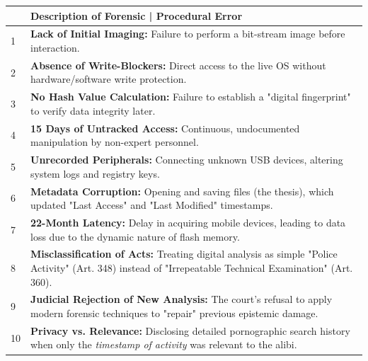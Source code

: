 \begin{table}[H]
\centering
\begin{tabular}{|l|p{13cm}|}
\hline
 & \textbf{Description of Forensic |   Procedural Error} \\
\hline
1 & \textbf{Lack of Initial Imaging:} Failure to perform a bit-stream image before interaction. \\
\hline
2 & \textbf{Absence of Write-Blockers:} Direct access to the live OS without hardware/software write protection. \\
\hline
3 & \textbf{No Hash Value Calculation:} Failure to establish a "digital fingerprint" to verify data integrity later. \\
\hline
4 & \textbf{15 Days of Untracked Access:} Continuous, undocumented manipulation by non-expert personnel. \\
\hline
5 & \textbf{Unrecorded Peripherals:} Connecting unknown USB devices, altering system logs and registry keys. \\
\hline
6 & \textbf{Metadata Corruption:} Opening and saving files (the thesis), which updated "Last Access" and "Last Modified" timestamps. \\
\hline
7 & \textbf{22-Month Latency:} Delay in acquiring mobile devices, leading to data loss due to the dynamic nature of flash memory. \\
\hline
8 & \textbf{Misclassification of Acts:} Treating digital analysis as simple "Police Activity" (Art. 348) instead of "Irrepeatable Technical Examination" (Art. 360). \\
\hline
9 & \textbf{Judicial Rejection of New Analysis:} The court's refusal to apply modern forensic techniques to "repair" previous epistemic damage. \\
\hline
10 & \textbf{Privacy vs. Relevance:} Disclosing detailed pornographic search history when only the \textit{timestamp of activity} was relevant to the alibi. \\
\hline
\end{tabular}
\end{table}
